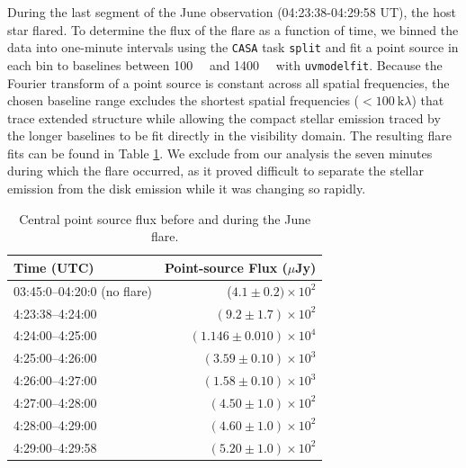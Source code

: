 \documentclass[12pt,oneside]{book}
\begin{document}
During the last segment of the June observation (04:23:38-04:29:58 UT), the host star flared. 
To determine the flux of the flare as a function of time, we binned the data into one-minute intervals using the \texttt{CASA} task \texttt{split} and fit a point source in each bin to baselines between \SI{100}{\kilo \lambda} and \SI{1400}{\kilo \lambda} with \texttt{uvmodelfit}. 
Because the Fourier transform of a point source is constant across all spatial frequencies, the chosen baseline range excludes the shortest spatial frequencies ($< \SI{100}{\kilo \lambda}$) that trace extended structure while 
allowing the compact stellar emission traced by the longer baselines to be fit directly in the visibility domain.
The resulting flare fits can be found in Table \ref{tab:flare fluxes}. 
We exclude from our analysis the seven minutes during which the flare occurred, as it proved difficult to separate the stellar emission from the disk emission while it was changing so rapidly.

\begin{table}	
  \centering
  \begin{tabular}{lr}
    \toprule
    Time (UTC) & Point-source Flux ($\mu$Jy) \\
    \midrule
    03:45:0--04:20:0 (no flare) & ($4.1 \pm 0.2)  \times 10^2$\\
  	4:23:38--4:24:00 & $(9.2 \pm 1.7) \times 10^2$ \\
  	4:24:00--4:25:00 & $(1.146 \pm 0.010) \times 10^4$ \\
  	4:25:00--4:26:00 & $(3.59 \pm 0.10) \times 10^3$ \\
  	4:26:00--4:27:00 & $(1.58 \pm 0.10) \times 10^3$ \\
  	4:27:00--4:28:00 & $(4.50 \pm 1.0) \times 10^2$ \\
  	4:28:00--4:29:00 & $(4.60 \pm 1.0) \times 10^2$ \\
  	4:29:00--4:29:58 & $(5.20 \pm 1.0) \times 10^2$\\
    \bottomrule
  \end{tabular}
	\caption{Central point source flux before and during the June flare.}
  \label{tab:flare fluxes}
\end{table}
\end{document}
